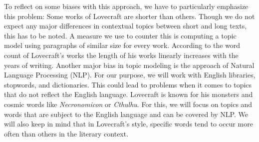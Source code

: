 To reflect on some biases with this approach, we have to particularly emphasize this problem: 
Some works of Lovecraft are shorter than others. Though we do not expect any major differences 
in contextual topics between short and long texts, this has to be noted. A measure we use to 
counter this is computing a topic model using paragraphs of similar size for every work. 
According to the word count of Lovecraft's works the length of his works linearly increases 
with the years of writing. Another major bias in topic modeling is the approach of Natural 
Language Processing (NLP). For our purpose, we will work with English libraries, stopwords, 
and dictionaries. This could lead to problems when it comes to topics that do not reflect the 
English language. Lovecraft is known for his monsters and cosmic words like \textit{Necronomicon} or 
\textit{Cthulhu}. For this, we will focus on topics and words that are subject to the English language 
and can be covered by NLP. We will also keep in mind that in Lovecraft's style, specific words 
tend to occur more often than others in the literary context.
